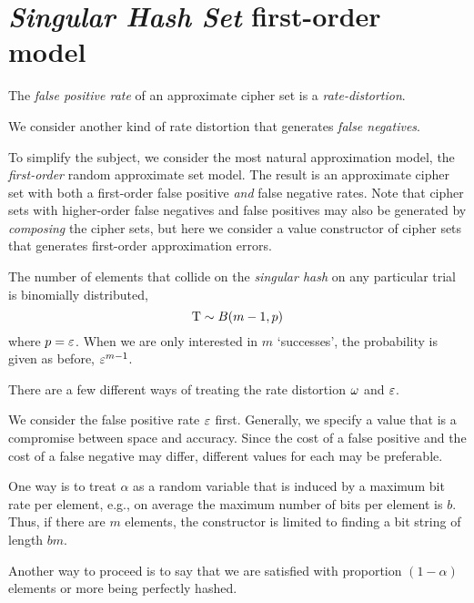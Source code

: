 \documentclass[ ../main.tex]{subfiles}
\begin{document}
\section{\emph{Singular Hash Set} first-order model}
\label{sec:foshs}

The \emph{false positive rate} of an approximate cipher set is a \emph{rate-distortion}.

We consider another kind of rate distortion that generates \emph{false negatives}.

To simplify the subject, we consider the most natural approximation model, the \emph{first-order} random approximate set model.
The result is an approximate cipher set with both a first-order false positive \emph{and} false negative rates.
Note that cipher sets with higher-order false negatives and false positives may also be generated by \emph{composing} the cipher sets, but here we consider a value constructor of cipher sets that generates first-order approximation errors.

The number of elements that collide on the \emph{singular hash} on any particular trial is binomially distributed,
\begin{equation}
\mathrm{T} \sim B(m-1,p)
\end{equation}
where $p = \varepsilon$.
When we are only interested in $m$ `successes', the probability is given as before, $\varepsilon^{m-1}$.

There are a few different ways of treating the rate distortion $\omega$ and $\varepsilon$.

We consider the false positive rate $\varepsilon$ first.
Generally, we specify a value that is a compromise between space and accuracy.
Since the cost of a false positive and the cost of a false negative may differ, different values for each may be preferable.

One way is to treat $\alpha$ as a random variable that is induced by a maximum bit rate per element, e.g., on average the maximum number of bits per element is $b$.
Thus, if there are $m$ elements, the constructor is limited to finding a bit string of length $b m$.

Another way to proceed is to say that we are satisfied with proportion $(1-\alpha)$ elements or more being perfectly hashed.
\end{document}
